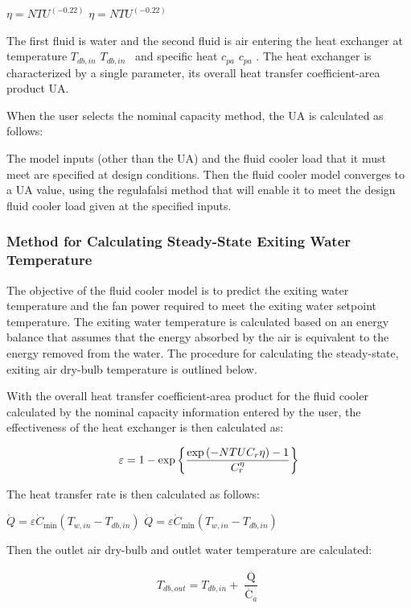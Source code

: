 \(\eta = NT{U^{( - 0.22)}}\) \(\eta = NT{U^{( - 0.22)}}\)

The first fluid is water and the second fluid is air entering the heat exchanger at temperature \({T_{db,in}}\) \({T_{db,in}}\) ~and specific heat \({c_{pa}}\) \({c_{pa}}\) . The heat exchanger is characterized by a single parameter, its overall heat transfer coefficient-area product UA.

When the user selects the nominal capacity method, the UA is calculated as follows:

The model inputs (other than the UA) and the fluid cooler load that it must meet are specified at design conditions. Then the fluid cooler model converges to a UA value, using the regulafalsi method that will enable it to meet the design fluid cooler load given at the specified inputs.

\subsubsection{Method for Calculating Steady-State Exiting Water Temperature}\label{method-for-calculating-steady-state-exiting-water-temperature-1}

The objective of the fluid cooler model is to predict the exiting water temperature and the fan power required to meet the exiting water setpoint temperature. The exiting water temperature is calculated based on an energy balance that assumes that the energy absorbed by the air is equivalent to the energy removed from the water. The procedure for calculating the steady-state, exiting air dry-bulb temperature is outlined below.

With the overall heat transfer coefficient-area product for the fluid cooler calculated by the nominal capacity information entered by the user, the effectiveness of the heat exchanger is then calculated as:

\begin{equation}
  \varepsilon = 1-\exp{\CB{ \frac{\exp{\PB{-NTU C_r \eta}}-1}{C_{r}^{\eta}} }}
\end{equation}

The heat transfer rate is then calculated as follows:

\(\dot Q = \varepsilon {\dot C_{\min }}({T_{w,in}} - {T_{db,in}})\) \(\dot Q = \varepsilon {\dot C_{\min }}({T_{w,in}} - {T_{db,in}})\)

Then the outlet air dry-bulb and outlet water temperature are calculated:

\begin{equation}
{T_{db,out}} = {T_{db,in}} + \frac{{\mathop Q\limits^. }}{{{{\mathop C\limits^. }_a}}}
\end{equation}

